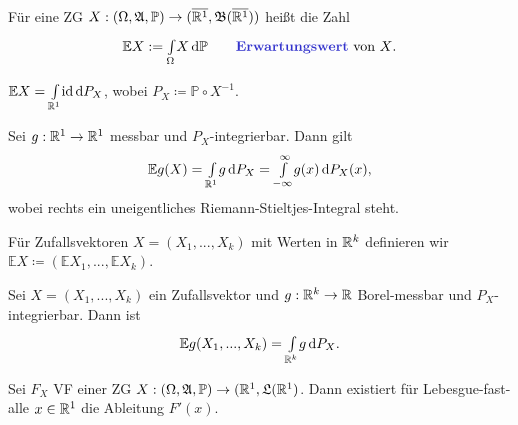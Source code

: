 \documentclass{cheat-sheet}
\newcommand{\Alg}{\mathfrak{A}} %
\newcommand{\LebAlg}{\mathfrak{L}} %
\renewcommand{\P}{\mathbb{P}} %
\newcommand{\E}{\mathbb{E}} %
\newcommand{\Bor}{\mathfrak{B}} %
\renewcommand{\ER}{\overline{\R^1}} %
\begin{document}
\begin{defn}
  Für eine ZG $X : (\Omega, \Alg, \P) \to (\ER, \Bor(\ER))$ heißt die Zahl
  \[ \E X := \Int{\Omega}{}{X}{\P} \qquad \text{\emph{Erwartungswert} von $X$.} \]
\end{defn}

\begin{satz}
  $\E X = \Int{\R^1}{}{\id}{P_X}$, wobei $P_X \coloneqq \P \circ X^{-1}$.
\end{satz}

\begin{kor}
  Sei $g : \mathbb{R}^1 \to \mathbb{R}^1$ messbar und $P_X$-integrierbar. Dann gilt
  \[ \E g(X) = \Int{\R^1}{}{g}{P_X} = \Int{-\infty}{\infty}{g(x)}{P_X(x)}, \]
  wobei rechts ein uneigentliches Riemann-Stieltjes-Integral steht.
\end{kor}

\begin{defn}
  Für Zufallsvektoren $X = (X_1, ..., X_k)$ mit Werten in $\mathbb{R}^k$ definieren wir $\E X \coloneqq (\E X_1, ..., \E X_k)$.
\end{defn}

\begin{bem}
  Sei $X = (X_1, ..., X_k)$ ein Zufallsvektor und $g : \mathbb{R}^k \to \mathbb{R}$ Borel-messbar und $P_X$-integrierbar. Dann ist
  \[ \E g(X_1, ..., X_k) = \Int{\R^k}{}{g}{P_{X}}. \]
\end{bem}



\begin{satz}
  Sei $F_X$ VF einer ZG $X : (\Omega, \Alg, \P) \to (\R^1, \LebAlg(\R^1)$. Dann existiert für Lebesgue-fast-alle $x \in \mathbb{R}^1$ die Ableitung $F'(x)$.
\end{satz}
\end{document}

